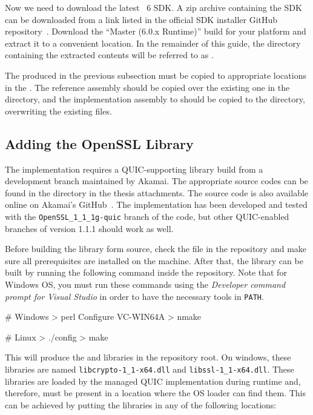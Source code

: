 Now we need to download the latest \dotnet{}~6 SDK\@. A zip archive containing the SDK can be
downloaded from a link listed in the official SDK installer GitHub
repository~\cite{dotnetSdkGithub}. Download the ``Master (6.0.x Runtime)'' build for your platform
and extract it to a convenient location. In the remainder of this guide, the directory containing
the extracted contents will be referred to as .

The \SystemNetQuicDll{} produced in the previous subsection must be copied to appropriate locations
in the . The reference \SystemNetQuicDll{} assembly should be copied over the
existing one in the
 directory, and
the implementation assembly to should be copied to the
 directory, overwriting the
existing files.

\subsection{Adding the OpenSSL Library}\label{sec:06openssl}

The implementation requires a QUIC-supporting \libopenssl{} library build from a development branch
maintained by Akamai. The appropriate source codes can be found in the 
directory in the thesis attachments. The source code is also available online on Akamai's
GitHub~\cite{AkamaiOpensslGithub}. The implementation has been developed and tested with the
\texttt{OpenSSL_1_1_1g-quic} branch of the code, but other QUIC-enabled branches of \libopenssl{}
version 1.1.1 should work as well.

Before building the \libopenssl{} library form source, check the  file in the
repository and make sure all prerequisites are installed on the machine. After that, the
\libopenssl{} library can be built by running the following command inside the repository. Note that
for Windows OS, you must run these commands using the \textit{Developer command prompt for Visual
  Studio} in order to have the necessary tools in \texttt{PATH}.

\begin{myVerbatim}
# Windows
> perl Configure VC-WIN64A
> nmake

# Linux
> ./config
> make
\end{myVerbatim}

This will produce the  and  libraries in the \libopenssl{}
repository root. On windows, these libraries are named \texttt{libcrypto-1_1-x64.dll} and
\texttt{libssl-1_1-x64.dll}. These libraries are loaded by the managed QUIC implementation during
runtime and, therefore, must be present in a location where the OS loader can find them. This can be
achieved by putting the libraries in any of the following locations:

